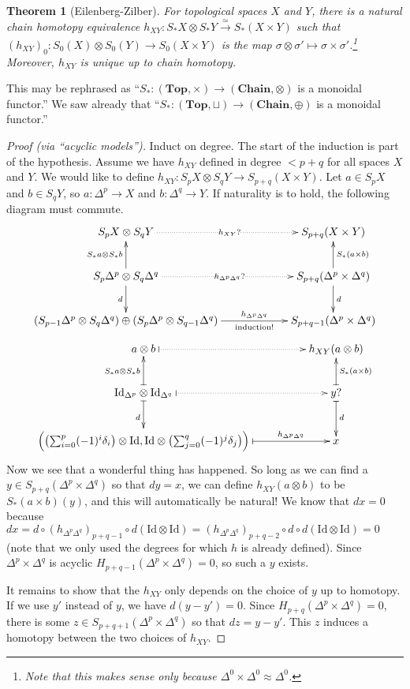 \documentclass[12pt]{article}
\theoremstyle{plain}
\newtheorem{theorem}[equation]{Theorem}
\theoremstyle{definition}
\theoremstyle{remark}
\newcommand{\id}{\mathrm{Id}}
\begin{document}
 \begin{theorem}[Eilenberg-Zilber] \label{T:Eilenberg-Zilber}
   For topological spaces $X$ and $Y$, there is a \emph{natural} chain homotopy
   equivalence $ h_{XY}:S_*X\otimes S_* Y\xrightarrow{\simeq} S_*(X\times Y)$ such that
   $(h_{XY})_0:S_0(X)\otimes S_0(Y)\to S_0(X\times Y)$ is the map $\sigma\otimes
   \sigma'\mapsto \sigma\times \sigma'$.\footnote{Note that this makes sense only because
   $\Delta^0\times \Delta^0\approx \Delta^0$.} Moreover, $h_{XY}$ is unique up to chain
   homotopy.
 \end{theorem}
 This may be rephrased as ``$S_*:(\textbf{Top},\times)\to (\textbf{Chain},\otimes)$ is a
 monoidal functor.'' We saw already that ``$S_*:(\textbf{Top},\sqcup)\to
 (\textbf{Chain},\oplus)$ is a monoidal functor.''
 \begin{proof}[Proof (via ``acyclic models'')]
   Induct on degree. The start of the induction is part of the hypothesis. Assume we have
   $h_{XY}$ defined in degree $<p+q$ for all spaces $X$ and $Y$. We would like to define
   $h_{XY}:S_p X\otimes S_q Y\to S_{p+q}(X\times Y)$. Let $a\in S_p X$ and $b\in S_q Y$,
   so $a:\Delta^p\to X$ and $b:\Delta^q\to Y$. If naturality is to hold, the following
   diagram must commute.
   \[\xymatrix @C+3pc{
   S_p X\otimes S_q Y \ar@{.>}[r]|{h_{XY}?} & S_{p+q}(X\times Y)\\
    S_p\Delta^p \otimes S_q\Delta^q \ar@{.>}[r]|{h_{\Delta^p\Delta^q}?}
   \ar[u]^{S_*a\otimes S_*b} \ar[d]_{d} & S_{p+q}(\Delta^p\times \Delta^q) \ar[u]_{S_*(a\times b)} \ar[d]^d\\
   (S_{p-1}\Delta^p\otimes S_q\Delta^q )\oplus (S_p\Delta^p\otimes S_{q-1}\Delta^q)
   \ar[r]^<>(.5){h_{\Delta^p\Delta^q}}_<>(.5){\text{induction!}} & S_{p+q-1}(\Delta^p\times \Delta^q)
   }\]
   \[\xymatrix @C+2pc{
    a\otimes b \ar@{|.>}[r] & h_{XY}(a\otimes b) \\
    \id_{\Delta^p}\otimes \id_{\Delta^q} \ar@{|->}[u]^{S_*a\otimes S_*b} \ar@{|->}[d]_d \ar@{|.>}[r]
    & y? \ar@{|->}[u]_{S_*(a\times b)} \ar@{|->}[d]^d \\
    \Bigl(\bigl(\sum_{i=0}^p (-1)^i \delta_i\bigr)\otimes \id, \id\otimes \bigl(\sum_{j=0}^q(-1)^j\delta_j\bigr)
    \Bigr) \ar@{|->}[r]^<>(.5){h_{\Delta^p\Delta^q}} & x
   }
   \]
   Now we see that a wonderful thing has happened. So long as we can find a $y\in
   S_{p+q}(\Delta^p\times \Delta^q)$ so that $dy=x$, we can define $h_{XY}(a\otimes b)$
   to be $S_*(a\times b)(y)$, and this will automatically be natural! We know that $dx=0$
   because $dx = d\circ (h_{\Delta^p\Delta^q})_{p+q-1}\circ d (\id\otimes \id) =
   (h_{\Delta^p\Delta^q})_{p+q-2}\circ d\circ d(\id\otimes \id) =0$ (note that we only
   used the degrees for which $h$ is already defined).
   Since $\Delta^p\times \Delta^q$ is acyclic $H_{p+q-1}(\Delta^p\times \Delta^q)=0$, so
   such a $y$ exists.

   It remains to show that the $h_{XY}$ only depends on the choice of $y$ up to homotopy.
   If we use $y'$ instead of $y$, we have $d(y-y')=0$. Since $H_{p+q}(\Delta^p\times
   \Delta^q)=0$, there is some $z\in S_{p+q+1}(\Delta^p\times\Delta^q)$ so that
   $dz=y-y'$. This $z$ induces a homotopy between the two choices of $h_{XY}$.
 \end{proof}
\end{document}
